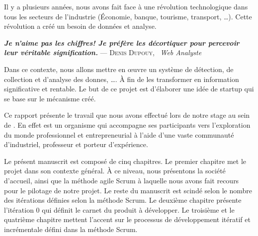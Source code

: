 

Il y a plusieurs années, nous avons fait face à une révolution technologique
dans tous les secteurs de l'industrie (Économie, banque, tourisme,
transport, \ldots). Cette révolution a créé un besoin de données et analyse.

\begin{center}
\textbf{\textit{Je n’aime pas les chiffres! Je préfère les décortiquer pour
percevoir leur véritable signification.}} \linebreak
\hfill --- \textsc{Denis Dupouy}, \ \textit{Web Analyste}
\end{center}

Dans ce contexte, nous allons mettre en \oe{}uvre un système de détection, de
collection et d'analyse des donnes, \ldots. À fin de les transformer en
information significative et rentable. Le but de ce projet est d'élaborer une
idée de startup qui se base sur le mécanisme créé.

Ce rapport présente le travail que nous avons effectué lors de notre stage au
sein de . En effet  est
un organisme qui accompagne ses participants vers l'exploration du monde
professionnel et entrepreneurial à l'aide d'une vaste communauté d'industriel,
professeur et porteur d'expérience.


Le présent manuscrit est composé de cinq chapitres. Le premier chapitre met le
projet dans son contexte général. À ce niveau, nous présentons la société
d’accueil, ainsi que la méthode agile Scrum à laquelle nous avons fait recours
pour le pilotage de notre projet. Le reste du manuscrit est scindé selon le
nombre des itérations définies selon la méthode Scrum. Le deuxième chapitre
présente l'itération 0 qui définit le carnet du produit à développer. Le
troisième et le quatrième chapitre mettent l'accent sur le processus de
développement itératif et incrémentale défini dans la méthode Scrum.

